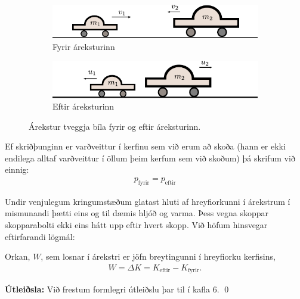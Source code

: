 \ifdefined \wholebook \else\documentclass[oneside]{book}\usepackage{EdlBook}\graphicspath{{figures/}}
\begin{document}
\begin{figure}[H]
    \centering
\begin{subfigure}[h]{.4\textwidth}
    \centering
    \includegraphics[width=\linewidth]{figures/farekstur.pdf}
    \caption{Fyrir áreksturinn}
    \label{fig:farekstur}
\end{subfigure}
\hfill
\begin{subfigure}[h]{.4\textwidth}
    \centering
    \includegraphics[width=\linewidth]{figures/earekstor.pdf}
    \caption{Eftir áreksturinn}
    \label{fig:earekstor}
\end{subfigure}
\caption{Árekstur tveggja bíla fyrir og eftir áreksturinn.}
\label{fig:arekstur}
\end{figure}

Ef skriðþunginn er varðveittur í kerfinu sem við erum að skoða (hann er ekki endilega alltaf varðveittur í öllum þeim kerfum sem við skoðum) þá skrifum við einnig:
\begin{align*}
    p_{\text{fyrir}} = p_{\text{eftir}}
\end{align*}

Undir venjulegum kringumstæðum glatast hluti af hreyfiorkunni í árekstrum í mismunandi þætti eins og til dæmis hljóð og varma. Þess vegna skoppar skopparabolti ekki eins hátt upp eftir hvert skopp. Við höfum hinsvegar eftirfarandi lögmál:

\begin{tcolorbox}
\begin{theorem}
Orkan, $W$, sem losnar í árekstri er jöfn breytingunni í hreyfiorku kerfisins,
\begin{align*}
    W = \Delta K = K_{\text{eftir}} - K_{\text{fyrir}}. 
\end{align*}
\end{theorem}
\end{tcolorbox}

\textbf{Útleiðsla:} Við frestum formlegri útleiðslu þar til í kafla 6.  \qed

\vspace{0.25cm}
\end{document}
